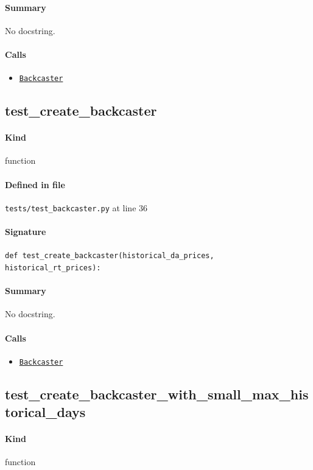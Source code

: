 \documentclass[11pt]{report}
\begin{document}
\paragraph{Summary} No docstring.
\paragraph{Calls}
\begin{itemize}[leftmargin=*]
  \item \hyperref[def:forecaster.py:Backcaster:L321]{\texttt{Backcaster}}
\end{itemize}
\subsection{test\_create\_backcaster}
\label{def:tests-test_backcaster.py:test_create_backcaster:L36}
\paragraph{Kind} function
\paragraph{Defined in file} \texttt{tests/test\_backcaster.py} at line 36
\paragraph{Signature} \texttt{def test\_create\_backcaster(historical\_da\_prices, historical\_rt\_prices):}
\paragraph{Summary} No docstring.
\paragraph{Calls}
\begin{itemize}[leftmargin=*]
  \item \hyperref[def:forecaster.py:Backcaster:L321]{\texttt{Backcaster}}
\end{itemize}
\subsection{test\_create\_backcaster\_with\_small\_max\_historical\_days}
\label{def:tests-test_backcaster.py:test_create_backcaster_with_small_max_historical_days:L43}
\paragraph{Kind} function
\end{document}
